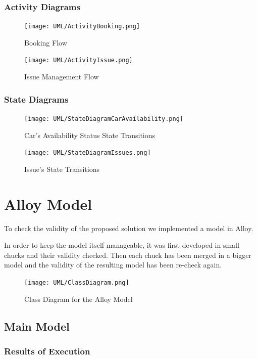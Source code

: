 \documentclass[11pt]{article} %
\begin{document}
\subsubsection{Activity Diagrams}
\begin{figure}[H]
	\centering
	\texttt{[image: UML/ActivityBooking.png]}
	\caption{Booking Flow}
\end{figure}

\begin{figure}[H]
	\centering
	\texttt{[image: UML/ActivityIssue.png]}
	\caption{Issue Management Flow}
\end{figure}
\newpage


\subsubsection{State Diagrams}
\begin{figure}[H]
	\centering
	\texttt{[image: UML/StateDiagramCarAvailability.png]}
	\caption{Car's Availability Status State Transitions}
\end{figure}
\begin{figure}[H]
	\centering
	\texttt{[image: UML/StateDiagramIssues.png]}
	\caption{Issue's State Transitions}
\end{figure}



\newpage
\section{Alloy Model}

To check the validity of the proposed solution we implemented a model in Alloy.

In order to keep the model itself manageable, it was first developed in small chucks and their validity checked. Then each chuck has been merged in a bigger model and the validity of the resulting model has been re-check again.

\begin{figure}[H]
	\centering
	\texttt{[image: UML/ClassDiagram.png]}
	\caption{Class Diagram for the Alloy Model}
\end{figure}

\subsection{Main Model}



\subsubsection{Results of Execution}
\end{document}
